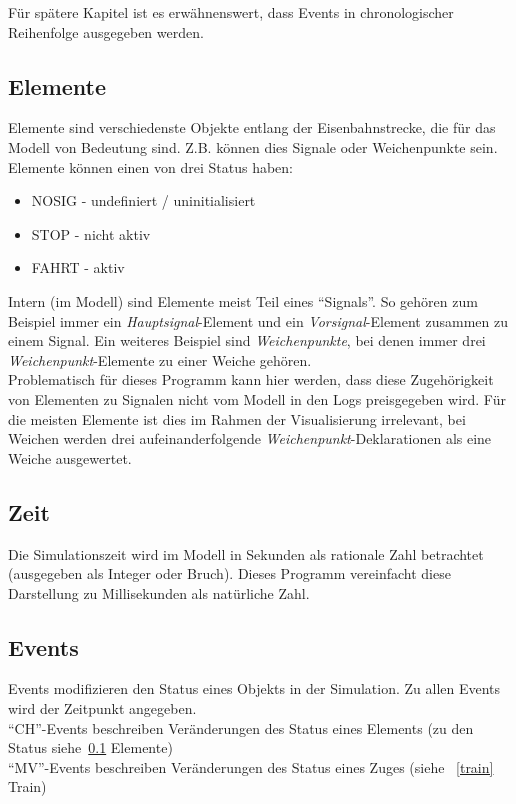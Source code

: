 \documentclass[accentcolor=tud0b,12pt,paper=a4]{tudreport}
\begin{document}
			Für spätere Kapitel ist es erwähnenswert, dass Events in chronologischer Reihenfolge ausgegeben werden.
			
		\subsection{Elemente}
		\label{elements}
			Elemente sind verschiedenste Objekte entlang der Eisenbahnstrecke, die für das Modell von Bedeutung sind. Z.B. können dies Signale oder Weichenpunkte sein.\\
			
			Elemente können einen von drei Status haben:
			\begin{itemize}
				\item NOSIG - undefiniert / uninitialisiert
				\item STOP  - nicht aktiv
				\item FAHRT - aktiv
			\end{itemize}
		
			Intern (im Modell) sind Elemente meist Teil eines "`Signals"'. So gehören zum Beispiel immer ein \textit{Hauptsignal}-Element und ein \textit{Vorsignal}-Element zusammen zu einem Signal. Ein weiteres Beispiel sind \textit{Weichenpunkte}, bei denen immer drei \textit{Weichenpunkt}-Elemente zu einer Weiche gehören.\\
			Problematisch für dieses Programm kann hier werden, dass diese Zugehörigkeit von Elementen zu Signalen nicht vom Modell in den Logs preisgegeben wird. Für die meisten Elemente ist dies im Rahmen der Visualisierung irrelevant, bei Weichen werden drei aufeinanderfolgende \textit{Weichenpunkt}-Deklarationen als eine Weiche ausgewertet.

		\subsection{Zeit}
			Die Simulationszeit wird im Modell in Sekunden als rationale Zahl betrachtet (ausgegeben als Integer oder Bruch). Dieses Programm vereinfacht diese Darstellung zu Millisekunden als natürliche Zahl.

		\subsection{Events}
		\label{events}
			Events modifizieren den Status eines Objekts in der Simulation. Zu allen Events wird der Zeitpunkt angegeben.\\
			
			"`CH"'-Events beschreiben Veränderungen des Status eines Elements (zu den Status siehe~\ref{elements} Elemente)\\
			"`MV"'-Events beschreiben Veränderungen des Status eines Zuges (siehe ~\ref{train} Train)
\end{document}
